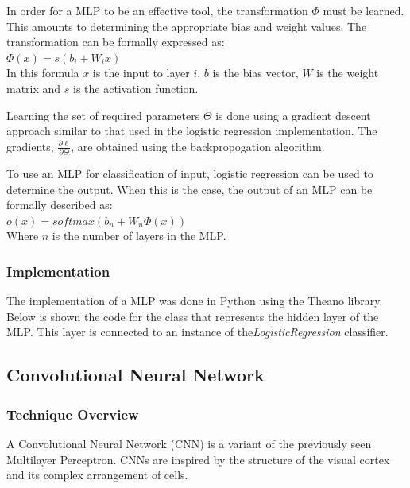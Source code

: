 \documentclass[12pt, titlepage]{article}
\begin{document}
  In order for a MLP to be an effective tool, the transformation $\Phi$ must be learned. This amounts to determining the
  appropriate bias and weight values. The transformation can be formally expressed as: \\
  \vspace{1mm}
  \hspace{7mm}$\Phi(x) = s(b_{i} + W_{i}x)$ \\
  In this formula $x$ is the input to layer $i$, $b$ is the bias vector, $W$ is the weight matrix and $s$ is the activation
  function.
  
  Learning the set of required parameters $\Theta$ is done using a gradient descent approach similar to that used in the
  logistic regression implementation. The gradients, $\frac{\partial \ell}{\partial \Theta}$, are obtained using the
  backpropogation algorithm.
  
  To use an MLP for classification of input, logistic regression can be used to determine the output. When this is the case,
  the output of an MLP can be formally described as: \\
  \vspace{1mm}
  \hspace{7mm}$o(x) = softmax(b_{n} + W_{n} \Phi(x))$ \\
  Where $n$ is the number of layers in the MLP.
  
  \subsubsection{Implementation}
  
  The implementation of a MLP was done in Python using the Theano library. Below is shown the code for the class that
  represents the hidden layer of the MLP. This layer is connected to an instance of the\textit{LogisticRegression} classifier.
    

\subsection{Convolutional Neural Network}
  \subsubsection{Technique Overview}
  
  A Convolutional Neural Network (CNN) is a variant of the previously seen Multilayer Perceptron. CNNs are inspired by the
  structure of the visual cortex and its complex arrangement of cells.
  
\end{document}
